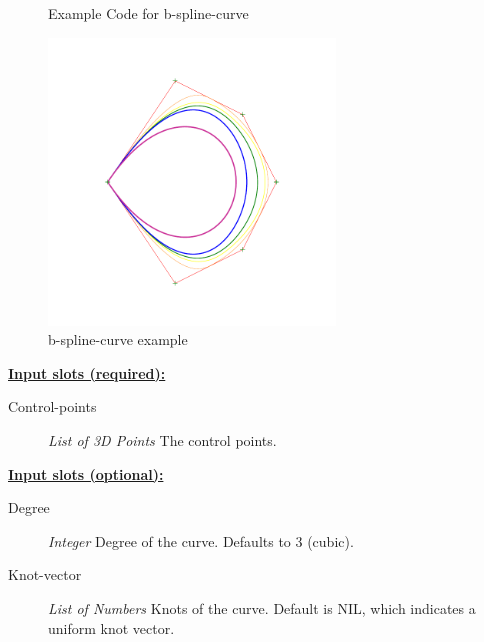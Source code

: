 \documentclass [11pt]{book}
\begin{document}
\begin{itemize}
\begin{figure}
\caption{Example Code for b-spline-curve}

\label{fig:example-code-b-spline-curve}

\end{figure}

\begin{figure}
\begin{center}
\includegraphics[width=3in,height=3in]{../images/example-b-spline-curve.pdf}
\end{center}

\caption{b-spline-curve example}

\label{fig:b-spline-curve}

\end{figure}





\textbf{
\underline{Input slots (required):}}

\begin{description}

\item [Control-points]
\emph{List of 3D Points} The control points.


\end{description}






\textbf{
\underline{Input slots (optional):}}

\begin{description}

\item [Degree]
\emph{Integer} Degree of the curve. Defaults to 3 (cubic).


\item [Knot-vector]
\emph{List of Numbers} Knots of the curve. Default is NIL, which indicates a uniform knot vector.



\end{description}
\end{itemize}
\end{document}
